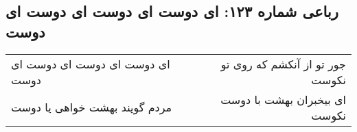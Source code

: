 \begin{center}
\section*{رباعی شماره ۱۲۳: ای دوست ای دوست ای دوست ای دوست}
\label{sec:sh123}
\begin{longtable}{l p{0.5cm} r}
ای دوست ای دوست ای دوست ای دوست
&&
جور تو از آنکشم که روی تو نکوست
\\
مردم گویند بهشت خواهی یا دوست
&&
ای بیخبران بهشت با دوست نکوست
\\
\end{longtable}
\end{center}
